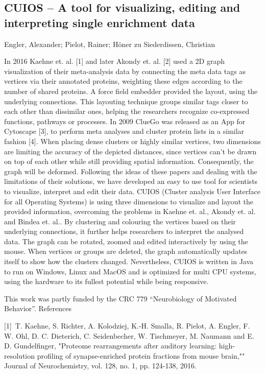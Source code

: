 {\subsection*{\color{eubicRed} CUIOS -- A tool for visualizing, editing and interpreting single enrichment data}
{\color{eubicGray}Engler, Alexander;
Pielot, Rainer;
Höner zu Siederdissen, Christian}

In 2016 Kaehne et. al. [1] and later Akondy et. al. [2] used a 2D graph visualization of their meta-analysis data by connecting the meta data tags as vertices via their annotated proteins, weighting these edges according to the number of shared proteins. A force field embedder provided the layout, using the underlying connections. This layouting technique groups similar tags closer to each other than dissimilar ones, helping the researchers recognize co-expressed functions, pathways or processes. In 2009 ClueGo was released as an App for Cytoscape [3], to perform meta analyses and cluster protein lists in a similar fashion [4]. When placing dense clusters or highly similar vertices, two dimensions are limiting the accuracy of the depicted distances, since vertices can’t be drawn on top of each other while still providing spatial information. Consequently, the graph will be deformed. Following the ideas of these papers and dealing with the limitations of their solutions, we have developed an easy to use tool for scientists to visualize, interpret and edit their data. CUIOS (Cluster analysis User Interface for all Operating Systems) is using three dimensions to visualize and layout the provided information, overcoming the problems in Kaehne et. al., Akondy et. al. and Bindea et. al.. By clustering and colouring the vertices based on their underlying connections, it further helps researchers to interpret the analysed data. The graph can be rotated, zoomed and edited interactively by using the mouse. When vertices or groups are deleted, the graph automatically updates itself to show how the clusters changed. Nevertheless, CUIOS is written in Java to run on Windows, Linux and MacOS and is optimized for multi CPU systems, using the hardware to its fullest potential while being responsive.

This work was partly funded by the CRC 779 “Neurobiology of Motivated Behavior”.
References

[1] T. Kaehne, S. Richter, A. Kolodziej, K.-H. Smalla, R. Pielot, A. Engler, F. W. Ohl, D. C. Dieterich, C. Seidenbecher, W. Tischmeyer, M. Naumann and E. D. Gundelfinger, "Proteome rearrangements after auditory learning: high-resolution profiling of synapse-enriched protein fractions from mouse brain,"" Journal of Neurochemistry, vol. 128, no. 1, pp. 124-138, 2016.

}
